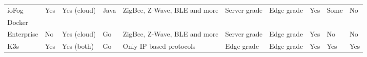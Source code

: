 \begin{table}[h!]
\begin{center}
{{\begin{tabular}{l|lll p{2.5cm} lllll}
ioFog             & Yes                                                                                                                            & Yes (cloud)                                                                                                                                  & Java & ZigBee, Z-Wave, BLE and more        & Server grade                                                                                                                               & Edge grade                                                                                                                               & Yes                                                                                                                               & Some                                                                                                                                  & No                                                                                                                                   \\
Docker\\Enterprise & No                                                                                                                             & Yes (cloud)                                                                                                                                  & Go   & ZigBee, Z-Wave, BLE and more        & Server grade                                                                                                                               & Edge grade                                                                                                                               & Yes                                                                                                                               & No                                                                                                                                    & No                                                                                                                                   \\
K3s               & Yes                                                                                                                            & Yes (both)                                                                                                                                   & Go   & Only IP based protocols             & Edge grade                                                                                                                                 & Edge grade                                                                                                                               & Yes                                                                                                                               & Yes                                                                                                                                   & Yes                                                                                                                                  \\

\end{tabular}}}
\end{center}
\end{table}
